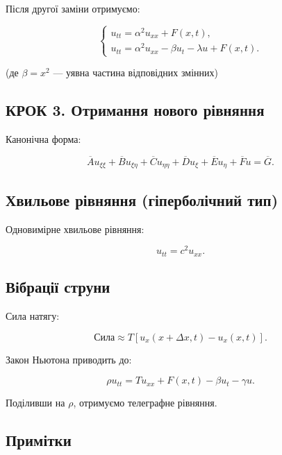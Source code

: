 Після другої заміни отримуємо:

\[
\begin{cases}
u_{tt} = \alpha^2 u_{xx} + F(x,t), \\
u_{tt} = \alpha^2 u_{xx} - \beta u_t - \lambda u + F(x,t).
\end{cases}
\]

(де \(\beta = x^2\) --- уявна частина відповідних змінних)

\subsection{КРОК 3. Отримання нового рівняння}\label{ux43aux440ux43eux43a-3.-ux43eux442ux440ux438ux43cux430ux43dux43dux44f-ux43dux43eux432ux43eux433ux43e-ux440ux456ux432ux43dux44fux43dux43dux44f}

Канонічна форма:

\[
\overline{A}u_{\xi\xi} + \overline{B}u_{\xi\eta} + \overline{C}u_{\eta\eta} + \overline{D}u_{\xi} + \overline{E}u_{\eta} + \overline{F}u = \overline{G}.
\]

\subsection{Хвильове рівняння (гіперболічний тип)}\label{ux445ux432ux438ux43bux44cux43eux432ux435-ux440ux456ux432ux43dux44fux43dux43dux44f-ux433ux456ux43fux435ux440ux431ux43eux43bux456ux447ux43dux438ux439-ux442ux438ux43f}

Одновимірне хвильове рівняння:

\[
u_{tt} = c^2 u_{xx}.
\]

\subsection{Вібрації струни}\label{ux432ux456ux431ux440ux430ux446ux456ux457-ux441ux442ux440ux443ux43dux438}

Сила натягу:

\[
\text{Сила} \approx T \left[ u_x(x + \Delta x, t) - u_x(x, t) \right].
\]

Закон Ньютона приводить до:

\[
\rho u_{tt} = T u_{xx} + F(x,t) - \beta u_t - \gamma u.
\]

Поділивши на \(\rho\), отримуємо телеграфне рівняння.

\subsection{Примітки}\label{ux43fux440ux438ux43cux456ux442ux43aux438-2}

